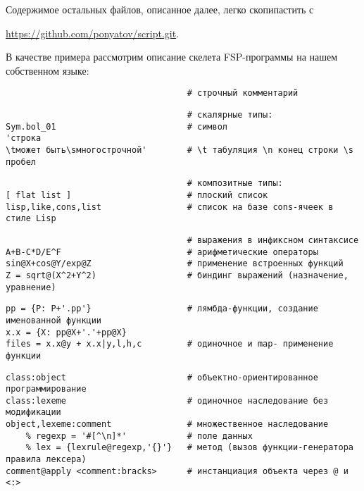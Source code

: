
\bigskip
Содержимое остальных файлов, описанное далее, легко скопипастить с

\bigskip
\url{https://github.com/ponyatov/script.git}.

\bigskip
В качестве примера рассмотрим описание скелета FSP-программы на нашем
собственном языке:



\begin{verbatim}
                                    # строчный комментарий
\end{verbatim}
\begin{verbatim}
                                    # скалярные типы:
Sym.bol_01                          # символ
'строка
\tможет быть\sмногострочной'        # \t табуляция \n конец строки \s пробел
\end{verbatim}
\begin{verbatim}
                                    # композитные типы:
[ flat list ]                       # плоский список
lisp,like,cons,list                 # список на базе cons-ячеек в стиле Lisp
\end{verbatim}
\begin{verbatim}
                                    # выражения в инфиксном синтаксисе
A+B-C*D/E^F                         # арифметические операторы
sin@X+cos@Y/exp@Z                   # применение встроенных функций
Z = sqrt@(X^2+Y^2)                  # биндинг выражений (назначение, уравнение)
\end{verbatim}
\begin{verbatim}
pp = {P: P+'.pp'}                   # лямбда-функции, создание именованной функции
x.x = {X: pp@X+'.'+pp@X}
files = x.x@y + x.x|y,l,h,c	        # одиночное и map- применение функции
\end{verbatim}
\begin{verbatim}
class:object                        # объектно-ориентированное программирование
class:lexeme                        # одиночное наследование без модификации
object,lexeme:comment               # множественное наследование
    % regexp = '#[^\n]*'            # поле данных
    % lex = {lexrule@regexp,'{}'}   # метод (вызов функции-генератора правила лексера)
comment@apply <comment:bracks>      # инстанциация объекта через @ и <:>
\end{verbatim}

